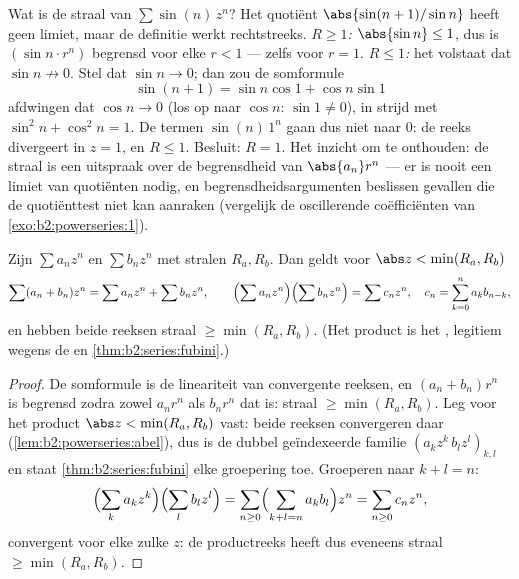 \begin{example}\label{ex:b2:powerseries:sinn}
Wat is de straal van $\sum \sin(n)\,z^n$? Het quotiënt
$\abs{\sin(n+1)/\sin n}$ heeft geen limiet, maar de definitie werkt
rechtstreeks. \emph{$R \geq 1$:} $\abs{\sin n} \leq 1$, dus is
$(\sin n\cdot r^n)$ begrensd voor elke $r < 1$ --- zelfs voor $r =
1$. \emph{$R \leq 1$:} het volstaat dat $\sin n \not\to 0$. Stel
dat $\sin n \to 0$; dan zou de somformule
\[
\sin(n+1) = \sin n\cos 1 + \cos n\sin 1
\]
afdwingen dat $\cos n \to 0$ (los op naar $\cos n$: $\sin 1 \neq
0$), in strijd met $\sin^2 n + \cos^2 n = 1$. De termen
$\sin(n)\,1^n$ gaan dus niet naar $0$: de reeks divergeert in $z =
1$, en $R \leq 1$. Besluit: $R = 1$. Het inzicht om te onthouden:
de straal is een uitspraak over de begrensdheid van
$\abs{a_n}r^n$ --- er is nooit een limiet van quotiënten nodig, en
begrensdheidsargumenten beslissen gevallen die de quotiënttest niet
kan aanraken (vergelijk de oscillerende coëfficiënten van
\cref{exo:b2:powerseries:1}).
\end{example}

\begin{proposition}[Bewerkingen]\label{prop:b2:powerseries:operations}
Zijn $\sum a_nz^n$ en $\sum b_nz^n$ met stralen $R_a, R_b$. Dan
geldt voor $\abs z < \min(R_a, R_b)$
\[
\sum (a_n + b_n)z^n = \sum a_nz^n + \sum b_nz^n,
\qquad
\Bigl(\sum a_nz^n\Bigr)\Bigl(\sum b_nz^n\Bigr) = \sum c_n z^n,
\quad c_n = \sum_{k=0}^{n} a_kb_{n-k},
\]
en hebben beide reeksen straal $\geq \min(R_a, R_b)$. (Het product
is het , legitiem wegens de  en
\cref{thm:b2:series:fubini}.)
\end{proposition}

\begin{proof}
De somformule is de lineariteit van convergente reeksen, en $(a_n +
b_n)r^n$ is begrensd zodra zowel $a_nr^n$ als $b_nr^n$ dat is:
straal $\geq \min(R_a, R_b)$. Leg voor het product $\abs z <
\min(R_a, R_b)$ vast: beide reeksen convergeren daar
\emph{} (\cref{lem:b2:powerseries:abel}), dus is de dubbel
geïndexeerde familie $(a_kz^k\,b_lz^l)_{k,l}$  en staat
\cref{thm:b2:series:fubini} elke groepering toe. Groeperen naar $k
+ l = n$:
\[
\Bigl(\sum_k a_kz^k\Bigr)\Bigl(\sum_l b_lz^l\Bigr)
= \sum_{n\geq0}\Bigl(\sum_{k+l=n}a_kb_l\Bigr)z^n
= \sum_{n\geq0}c_nz^n ,
\]
 convergent voor elke zulke $z$: de productreeks heeft dus
eveneens straal $\geq \min(R_a, R_b)$.
\end{proof}

